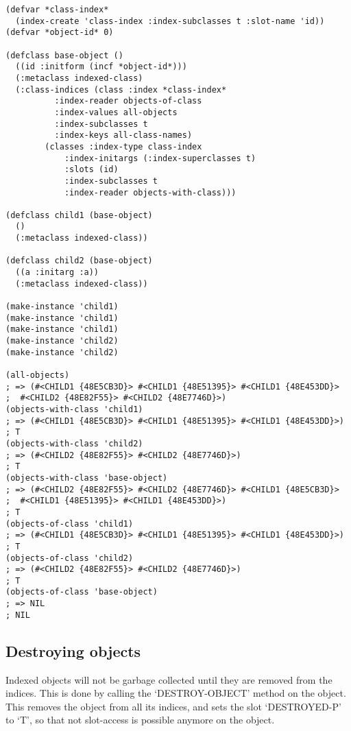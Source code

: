 \begin{Verbatim}[fontsize=\small,frame=leftline,framerule=0.9mm,rulecolor=\color{gray},framesep=5.1mm,xleftmargin=5mm,fontfamily=cmtt]
(defvar *class-index*
  (index-create 'class-index :index-subclasses t :slot-name 'id))
(defvar *object-id* 0)

(defclass base-object ()
  ((id :initform (incf *object-id*)))
  (:metaclass indexed-class)
  (:class-indices (class :index *class-index*
          :index-reader objects-of-class
          :index-values all-objects
          :index-subclasses t
          :index-keys all-class-names)
        (classes :index-type class-index
            :index-initargs (:index-superclasses t)
            :slots (id)
            :index-subclasses t
            :index-reader objects-with-class)))

(defclass child1 (base-object)
  ()
  (:metaclass indexed-class))

(defclass child2 (base-object)
  ((a :initarg :a))
  (:metaclass indexed-class))

(make-instance 'child1)
(make-instance 'child1)
(make-instance 'child1)
(make-instance 'child2)
(make-instance 'child2)

(all-objects)
; => (#<CHILD1 {48E5CB3D}> #<CHILD1 {48E51395}> #<CHILD1 {48E453DD}>
;  #<CHILD2 {48E82F55}> #<CHILD2 {48E7746D}>)
(objects-with-class 'child1)
; => (#<CHILD1 {48E5CB3D}> #<CHILD1 {48E51395}> #<CHILD1 {48E453DD}>)
; T
(objects-with-class 'child2)
; => (#<CHILD2 {48E82F55}> #<CHILD2 {48E7746D}>)
; T
(objects-with-class 'base-object)
; => (#<CHILD2 {48E82F55}> #<CHILD2 {48E7746D}> #<CHILD1 {48E5CB3D}>
;  #<CHILD1 {48E51395}> #<CHILD1 {48E453DD}>)
; T
(objects-of-class 'child1)
; => (#<CHILD1 {48E5CB3D}> #<CHILD1 {48E51395}> #<CHILD1 {48E453DD}>)
; T
(objects-of-class 'child2)
; => (#<CHILD2 {48E82F55}> #<CHILD2 {48E7746D}>)
; T
(objects-of-class 'base-object)
; => NIL
; NIL
\end{Verbatim}


\subsection{ Destroying objects}

Indexed objects will not be garbage collected until they are
removed from the indices. This is done by calling the
`DESTROY-OBJECT' method on the object. This removes the object
from all its indices, and sets the slot `DESTROYED-P' to `T', so
that not slot-access is possible anymore on the object.


